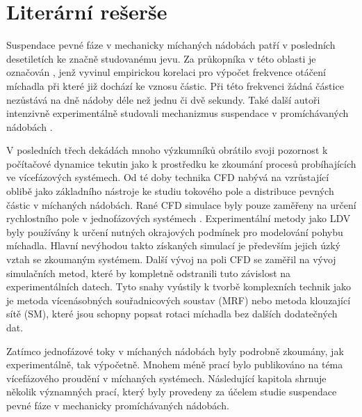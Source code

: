 \chapter{Literární rešerše}
Suspendace pevné fáze v mechanicky míchaných nádobách patří v posledních desetiletích ke značně studovanému jevu. Za průkopníka v této oblasti je označován \citet{zwi58}, jenž vyvinul empirickou korelaci pro výpočet frekvence otáčení míchadla při které již dochází ke vznosu částic. Při této frekvenci žádná částice nezůstává na dně nádoby déle než jednu či dvě sekundy. Také další autoři intenzivně experimentálně studovali mechanizmus suspendace v promíchávaných nádobách \citep{nie68,bal78,arm98}. 

V posledních třech dekádách mnoho výzkumníků obrátilo svoji pozornost k počítačové dynamice tekutin jako k prostředku ke zkoumání procesů probíhajících ve vícefázových systémech. Od té doby technika CFD nabývá na vzrůstající oblibě jako základního nástroje ke studiu tokového pole a distribuce pevných částic v míchaných nádobách. Rané CFD simulace byly pouze zaměřeny na určení rychlostního pole v jednofázových systémech \citep{kre91}. Experimentální metody jako LDV byly používány k určení nutných okrajových podmínek pro modelování pohybu míchadla. Hlavní nevýhodou takto získaných simulací je především jejich úzký vztah se zkoumaným systémem. Další vývoj na poli CFD se zaměřil na vývoj simulačních metod, které by kompletně odstranili tuto závislost na experimentálních datech. Tyto snahy vyústily k tvorbě komplexních technik jako je metoda vícenásobných souřadnicových soustav (MRF) nebo metoda klouzající sítě (SM), které jsou schopny popsat rotaci míchadla bez dalších dodatečných dat.  

Zatímco jednofázové toky v míchaných nádobách byly podrobně zkoumány, jak experimentálně, tak výpočetně. Mnohem méně prací bylo publikováno na téma vícefázového proudění v míchaných systémech. Následující kapitola shrnuje několik významných prací, který byly provedeny za účelem studie suspendace pevné fáze v mechanicky promíchávaných nádobách.
  
